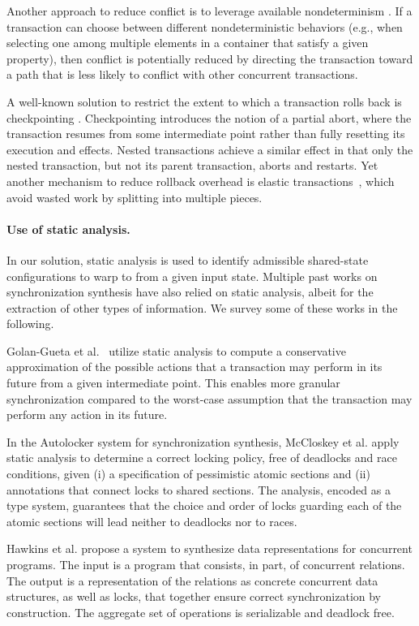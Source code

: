 Another approach to reduce conflict is to leverage available nondeterminism \cite{TKS:OOPSLA13}. If a transaction can choose between different nondeterministic behaviors (e.g., when selecting one among multiple elements in a container that satisfy a given property), then conflict is potentially reduced by directing the transaction toward a path that is less likely to conflict with other concurrent transactions.

A well-known solution to restrict the extent to which a transaction rolls back is checkpointing \cite{spaa08a,XXX}. Checkpointing introduces the notion of a partial abort, where the transaction resumes from some intermediate point rather than fully resetting its execution and effects. Nested transactions \cite{ont,beeri} achieve a similar effect in that only the nested transaction, but not its parent transaction, aborts and restarts. Yet another mechanism to reduce rollback overhead is elastic transactions~\cite{FGG:DISC09}, which avoid wasted work by splitting into multiple pieces.  

\paragraph{Use of static analysis.} In our solution, static analysis is used to identify admissible shared-state configurations to warp to from a given input state. Multiple past works on synchronization synthesis have also relied on static analysis, albeit for the extraction of other types of information. We survey some of these works in the following.

Golan-Gueta et al.~\cite{GRSY:PLDI13} utilize static analysis to compute a conservative approximation of the possible actions that a transaction may perform in its future from a given intermediate point. This enables more granular synchronization compared to the worst-case assumption that the transaction may perform any action in its future.

In the Autolocker system for synchronization synthesis, McCloskey et al. \cite{POPL'05} apply static analysis to determine a correct locking policy, free of deadlocks and race conditions, given (i) a specification of pessimistic atomic sections and (ii) annotations that connect locks to shared sections. The analysis, encoded as a type system, guarantees that the choice and order of locks guarding each of the atomic sections will lead neither to deadlocks nor to races.

Hawkins et al. \cite{HawkinsPLDI13} propose a system to synthesize data representations for concurrent programs. The input is a program that consists, in part, of concurrent relations. The output is a representation of the relations as concrete concurrent data structures, as well as locks, that together ensure correct synchronization by construction. The aggregate set of operations is serializable and deadlock free.

